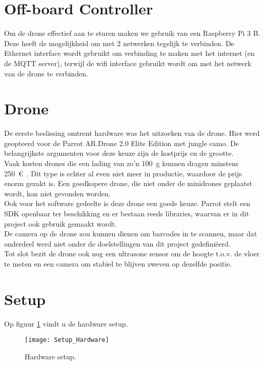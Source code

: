 \section{Off-board Controller} \label{sec:offboard_controller}
Om de drone effectief aan te sturen maken we gebruik van een Raspberry Pi 3 B. Deze heeft de mogelijkheid om met 2 netwerken tegelijk te verbinden. De Ethernet interface wordt gebruikt om verbinding te maken met het internet (en de MQTT server), terwijl de wifi interface gebruikt wordt om met het netwerk van de drone te verbinden.

\section{Drone} \label{sec:drone}
De eerste beslissing omtrent hardware was het uitzoeken van de drone. Hier werd geopteerd voor de Parrot AR.Drone 2.0 Elite Edition met jungle camo. De belangrijkste argumenten voor deze keuze zijn de kostprijs en de grootte.\\
Vaak kosten drones die een lading van zo'n \SI{100}{\g} kunnen dragen minstens \SI{250}{\euro{}}. Dit type is echter al even niet meer in productie, waardoor de prijs enorm gezakt is. Een goedkopere drone, die niet onder de minidrones geplaatst wordt, kon niet gevonden worden. \\
Ook voor het software gedeelte is deze drone een goede keuze. Parrot stelt een SDK openbaar ter beschikking en er bestaan reeds libraries, waarvan er in dit project ook gebruik gemaakt wordt.\\
De camera op de drone zou kunnen dienen om barcodes in te scannen, maar dat onderdeel werd niet onder de doelstellingen van dit project gedefini\"eerd.\\
Tot slot bezit de drone ook nog een ultrasone sensor om de hoogte t.o.v. de vloer te meten en een camera om stabiel te blijven zweven op dezelfde positie.

\section{Setup} \label{sec:setup_hardware}
Op figuur \ref{fig:setup_hardware} vindt u de hardware setup.
\begin{figure}[p]
	\centering
	\texttt{[image: Setup\_Hardware]}
	\caption[Hardware setup]{Hardware setup.}
	\label{fig:setup_hardware}
\end{figure}
